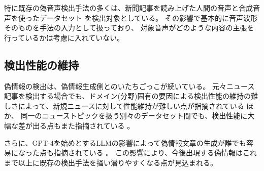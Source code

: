 特に既存の偽音声検出手法の多くは、新聞記事を読み上げた人間の音声と合成音声を使ったデータセット \cite{wu15e_interspeech,WANG2020101114}を検出対象としている。
その影響で基本的に音声波形そのものを手法の入力として扱っており、
対象音声がどのような内容の主張を行っているかは考慮に入れていない。

\subsection{検出性能の維持}
偽情報の検出は、偽情報生成側とのいたちごっこが続いている。
元々ニュース記事を検出する場合でも、ドメイン(分野)固有の要因による検出性能の維持の難しさによって、新規ニュースに対して性能維持が難しい点が指摘されている \cite{10.1145/3459637.3482139}ほか、
同一のニューストピックを扱う別々のデータセット間でも、検出性能に大幅な差が出る点もまた指摘されている \cite{10.1007/978-3-030-73696-5_13}。

さらに、GPT-4を始めとするLLMの影響によって偽情報文章の生成が誰でも容易になった点も指摘されている \cite{DWIVEDI2023102642}。
この影響により、今後出現する偽情報はこれまで以上に既存の検出手法を掻い潜りやすくなる点が見込まれる。

